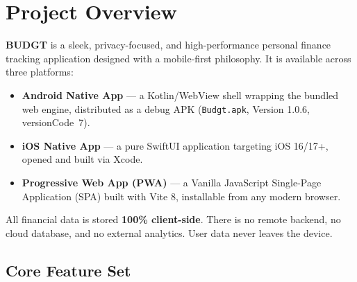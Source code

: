 \documentclass[12pt, a4paper]{article}
\begin{document}
\tableofcontents
\newpage

\section{Project Overview}

\textbf{BUDGT} is a sleek, privacy-focused, and high-performance personal finance tracking application designed with a mobile-first philosophy. It is available across three platforms:

\begin{itemize}[leftmargin=1.5em]
  \item \textbf{Android Native App} --- a Kotlin/WebView shell wrapping the bundled web engine, distributed as a debug APK (\texttt{Budgt.apk}, Version 1.0.6, versionCode~7).
  \item \textbf{iOS Native App} --- a pure SwiftUI application targeting iOS 16/17+, opened and built via Xcode.
  \item \textbf{Progressive Web App (PWA)} --- a Vanilla JavaScript Single-Page Application (SPA) built with Vite 8, installable from any modern browser.
\end{itemize}

All financial data is stored \textbf{100\% client-side}. There is no remote backend, no cloud database, and no external analytics. User data never leaves the device.

\subsection{Core Feature Set}
\end{document}
